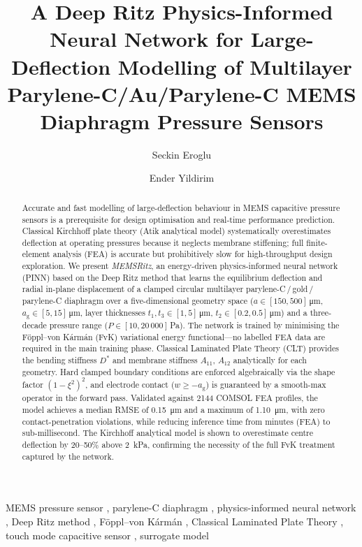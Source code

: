 \documentclass[review,12pt]{elsarticle}
\begin{document}
\begin{frontmatter}

\title{A Deep Ritz Physics-Informed Neural Network for Large-Deflection Modelling
       of Multilayer Parylene-C/Au/Parylene-C MEMS Diaphragm Pressure Sensors}

\author[metu]{Seckin Eroglu}
\author[metu]{Ender Yildirim}

\address[metu]{Department of Electrical and Electronics Engineering,
               Middle East Technical University, 06800 Ankara, Turkey}

\begin{abstract}
Accurate and fast modelling of large-deflection behaviour in MEMS capacitive
pressure sensors is a prerequisite for design optimisation and real-time
performance prediction. Classical Kirchhoff plate theory (Atik analytical
model) systematically overestimates deflection at operating pressures because
it neglects membrane stiffening; full finite-element analysis (FEA) is accurate
but prohibitively slow for high-throughput design exploration. We present
\emph{MEMSRitz}, an energy-driven physics-informed neural network (PINN) based
on the Deep Ritz method that learns the equilibrium deflection and radial
in-plane displacement of a clamped circular multilayer
parylene-C\,/\,gold\,/\,parylene-C diaphragm over a five-dimensional geometry
space ($a \in [150,500]$\,\si{\micro\metre},
$a_\mathrm{g} \in [5,15]$\,\si{\micro\metre}, layer thicknesses
$t_1,t_3\in[1,5]$\,\si{\micro\metre},
$t_2\in[0.2,0.5]$\,\si{\micro\metre}) and a three-decade pressure range
($P\in[10,20\,000]$\,Pa). The network is trained by minimising the
Föppl–von Kármán (FvK) variational energy functional—no labelled FEA data
are required in the main training phase. Classical Laminated Plate Theory (CLT)
provides the bending stiffness $D^*$ and membrane stiffness $A_{11}$,
$A_{12}$ analytically for each geometry. Hard clamped boundary conditions are
enforced algebraically via the shape factor $(1-\xi^2)^2$, and electrode
contact ($w \ge -a_\mathrm{g}$) is guaranteed by a smooth-max operator in the
forward pass. Validated against 2144 COMSOL FEA profiles, the model achieves a
median RMSE of \SI{0.15}{\micro\metre} and a maximum of \SI{1.10}{\micro\metre},
with zero contact-penetration violations, while reducing inference time from
minutes (FEA) to sub-millisecond. The Kirchhoff analytical model is shown to
overestimate centre deflection by 20–50\% above \SI{2}{\kilo\pascal},
confirming the necessity of the full FvK treatment captured by the network.
\end{abstract}

\begin{keyword}
MEMS pressure sensor \sep
parylene-C diaphragm \sep
physics-informed neural network \sep
Deep Ritz method \sep
Föppl–von Kármán \sep
Classical Laminated Plate Theory \sep
touch mode capacitive sensor \sep
surrogate model
\end{keyword}

\end{frontmatter}
\end{document}
